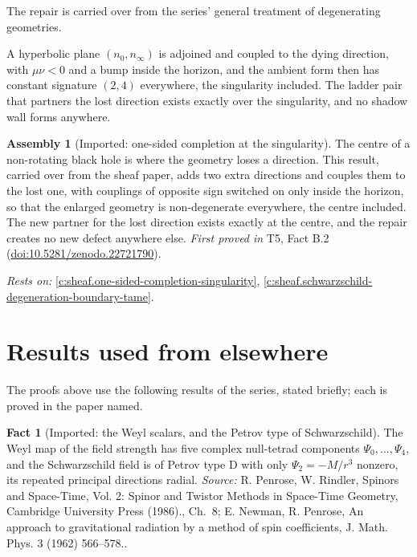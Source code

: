 \documentclass[11pt]{article}
\theoremstyle{definition}
\newtheorem{fact}[theorem]{Fact}
\newtheorem{assembled}[theorem]{Assembly}
\theoremstyle{plain}
\providecommand{\nInf}{}\renewcommand{\nInf}{n_\infty}
\providecommand{\nO}{}\renewcommand{\nO}{n_0}
\begin{document}
The repair is carried over from the series' general treatment of degenerating geometries.

A hyperbolic plane $(\nO, \nInf)$ is adjoined and coupled to the dying direction, with $\mu\nu < 0$ and a bump inside the horizon, and the ambient form then has constant signature $(2,4)$ everywhere, the singularity included. The ladder pair that partners the lost direction exists exactly over the singularity, and no shadow wall forms anywhere.

\begin{assembled}[Imported: one-sided completion at the singularity]\label{c:singularity.imported-one-sided-completion-singularity}
The centre of a non-rotating black hole is where the geometry loses a direction. This result, carried over from the sheaf paper, adds two extra directions and couples them to the lost one, with couplings of opposite sign switched on only inside the horizon, so that the enlarged geometry is non-degenerate everywhere, the centre included. The new partner for the lost direction exists exactly at the centre, and the repair creates no new defect anywhere else.
\emph{First proved in} T5, Fact B.2 (\href{https://doi.org/10.5281/zenodo.22721790}{doi:10.5281/zenodo.22721790}).
\end{assembled}
\noindent\emph{Rests on:} \ref{c:sheaf.one-sided-completion-singularity}, \ref{c:sheaf.schwarzschild-degeneration-boundary-tame}.

\section{Results used from elsewhere}
The proofs above use the following results of the series, stated briefly; each is proved in the paper named.

\begin{fact}[Imported: the Weyl scalars, and the Petrov type of Schwarzschild]\label{c:pairing.imported-weyl-scalars-petrov-type-schwarzschild}
The Weyl map of the field strength has five complex null-tetrad components $\Psi_0, \dots, \Psi_4$, and the Schwarzschild field is of Petrov type D with only $\Psi_2 = -M/r^3$ nonzero, its repeated principal directions radial.
\emph{Source:} R. Penrose, W. Rindler, Spinors and Space-Time, Vol. 2: Spinor and Twistor Methods in Space-Time Geometry, Cambridge University Press (1986)., Ch.~8; E. Newman, R. Penrose, An approach to gravitational radiation by a method of spin coefficients, J. Math. Phys. 3 (1962) 566--578..
\end{fact}
\end{document}
